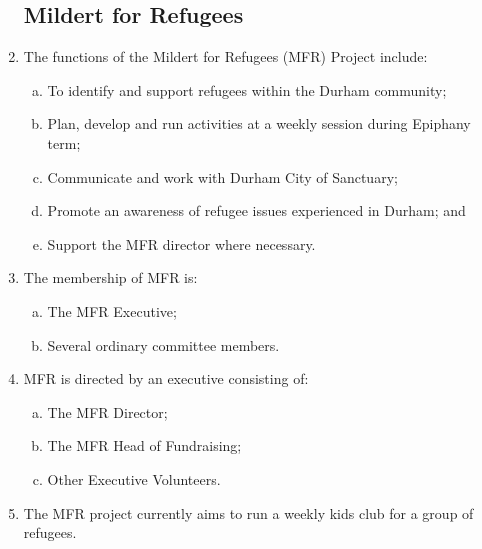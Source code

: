 \documentclass[12pt]{article}
\begin{document}
\begin{enumerate}
    \subsection{Mildert for Refugees}
    \item The functions of the Mildert for Refugees (MFR) Project include:
    \begin{enumerate}[(a)]
        \item To identify and support refugees within the Durham community;
        \item Plan, develop and run activities at a weekly session during Epiphany term; 
        \item Communicate and work with Durham City of Sanctuary;
        \item Promote an awareness of refugee issues experienced in Durham; and
        \item Support the MFR director where necessary.
    \end{enumerate}
    \item The membership of MFR is:
    \begin{enumerate}[(a)]
        \item The MFR Executive;
        \item Several ordinary committee members.
    \end{enumerate}
    \item MFR is directed by an executive consisting of:
    \begin{enumerate}[(a)]
        \item The MFR Director;
        \item The MFR Head of Fundraising;
        \item Other Executive Volunteers.
    \end{enumerate}
    \item The MFR project currently aims to run a weekly kids club for a group of refugees.
    

\end{enumerate}
\end{document}
